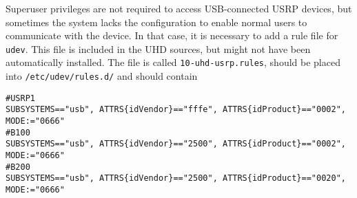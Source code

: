 Superuser privileges are not required to access USB-connected USRP devices, but
sometimes the system lacks the configuration to enable normal users to
communicate with the device.
In that case, it is necessary to add a rule file for \texttt{udev}. This file is
included in the UHD sources, but might not have been automatically installed.
The file is called \texttt{10-uhd-usrp.rules}, should be placed into
\texttt{/etc/udev/rules.d/} and should contain

{ \footnotesize
\begin{verbatim}
#USRP1
SUBSYSTEMS=="usb", ATTRS{idVendor}=="fffe", ATTRS{idProduct}=="0002", MODE:="0666"
#B100
SUBSYSTEMS=="usb", ATTRS{idVendor}=="2500", ATTRS{idProduct}=="0002", MODE:="0666"
#B200
SUBSYSTEMS=="usb", ATTRS{idVendor}=="2500", ATTRS{idProduct}=="0020", MODE:="0666"
\end{verbatim}
}

